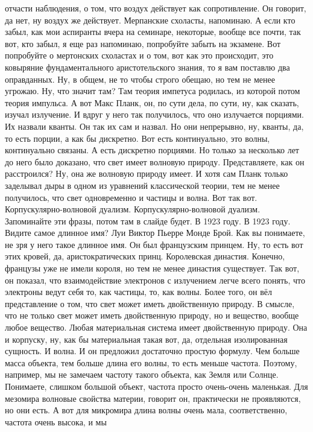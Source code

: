 отчасти наблюдения, о том, что воздух действует как сопротивление. Он говорит,
да нет, ну воздух же действует. Мерпанские схоласты, напоминаю. А если кто
забыл, как мои аспиранты вчера на семинаре, некоторые, вообще все почти, так
вот, кто забыл, я еще раз напоминаю, попробуйте забыть на экзамене. Вот
попробуйте о мертонских схоластах и о том, вот как это происходит, это ковыряние
фундаментального аристотельского знания, то я вам поставлю два оправданных. Ну,
в общем, не то чтобы строго обещаю, но тем не менее угрожаю. Ну, что значит там?
Там теория импетуса родилась, из которой потом теория импульса. А вот Макс
Планк, он, по сути дела, по сути, ну, как сказать, изучал излучение. И вдруг у
него так получилось, что оно излучается порциями. Их назвали кванты. Он так их
сам и назвал. Но они непрерывно, ну, кванты, да, то есть порции, а как бы
дискретно. Вот есть континуально, это волны, континуально связаны. А есть
дискретно порциями. Но только за несколько лет до него было доказано, что свет
имеет волновую природу. Представляете, как он расстроился? Ну, она же волновую
природу имеет. И хотя сам Планк только заделывал дыры в одном из уравнений
классической теории, тем не менее получилось, что свет одновременно и частицы и
волна. Вот так вот. Корпускулярно-волновой дуализм. Корпускулярно-волновой
дуализм. Запоминайте эти фразы, потом там в слайде будет. В 1923 году. В 1923
году. Видите самое длинное имя? Луи Виктор Пьерре Монде Брой. Как вы понимаете,
не зря у него такое длинное имя. Он был французским принцем. Ну, то есть вот
этих кровей, да, аристократических принц. Королевская династия. Конечно,
французы уже не имели короля, но тем не менее династия существует. Так вот, он
показал, что взаимодействие электронов с излучением легче всего понять, что
электроны ведут себя то, как частицы, то, как волны. Более того, он вёл
представление о том, что свет может иметь двойственную природу. В смысле, что не
только свет может иметь двойственную природу, но и вещество, вообще любое
вещество. Любая материальная система имеет двойственную природу. Она и корпуску,
ну, как бы материальная такая вот, да, отдельная изолированная сущность. И
волна. И он предложил достаточно простую формулу. Чем больше масса объекта, тем
больше длина его волны, то есть меньше частота. Поэтому, например, мы не
замечаем частоту такого объекта, как Земля или Солнце. Понимаете, слишком
большой объект, частота просто очень-очень маленькая. Для мезомира волновые
свойства материи, говорит он, практически не проявляются, но они есть. А вот для
микромира длина волны очень мала, соответственно, частота очень высока, и мы
